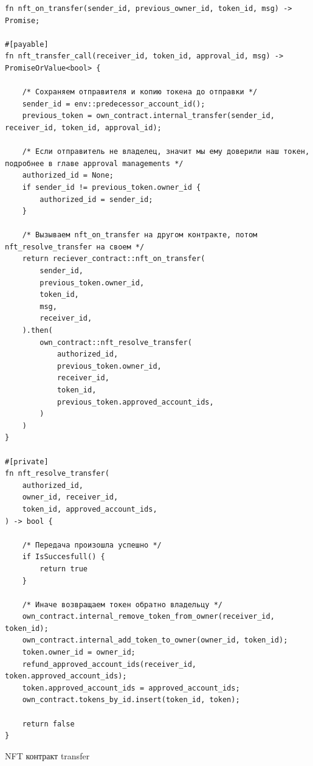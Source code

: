 \begin{listing}
\begin{verbatim}
fn nft_on_transfer(sender_id, previous_owner_id, token_id, msg) -> Promise;

#[payable]
fn nft_transfer_call(receiver_id, token_id, approval_id, msg) -> PromiseOrValue<bool> {

    /* Сохраняем отправителя и копию токена до отправки */
    sender_id = env::predecessor_account_id();
    previous_token = own_contract.internal_transfer(sender_id, receiver_id, token_id, approval_id);

    /* Если отправитель не владелец, значит мы ему доверили наш токен, подробнее в главе approval managements */
    authorized_id = None;
    if sender_id != previous_token.owner_id {
        authorized_id = sender_id;
    }

    /* Вызываем nft_on_transfer на другом контракте, потом nft_resolve_transfer на своем */
    return reciever_contract::nft_on_transfer(
        sender_id,
        previous_token.owner_id,
        token_id,
        msg,
        receiver_id,
    ).then(
        own_contract::nft_resolve_transfer(
            authorized_id,
            previous_token.owner_id,
            receiver_id,
            token_id,
            previous_token.approved_account_ids,
        )
    )
}

#[private]
fn nft_resolve_transfer(
    authorized_id,
    owner_id, receiver_id,
    token_id, approved_account_ids,
) -> bool {

    /* Передача произошла успешно */
    if IsSuccesfull() {
        return true
    }

    /* Иначе возвращаем токен обратно владельцу */
    own_contract.internal_remove_token_from_owner(receiver_id, token_id);
    own_contract.internal_add_token_to_owner(owner_id, token_id);
    token.owner_id = owner_id;
    refund_approved_account_ids(receiver_id, token.approved_account_ids);
    token.approved_account_ids = approved_account_ids;
    own_contract.tokens_by_id.insert(token_id, token);

    return false
}
\end{verbatim}
\caption{NFT контракт transfer}
\label{nftcontract.transfer1}
\end{listing}

